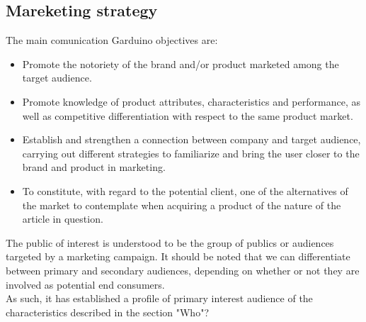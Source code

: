 \documentclass[11pt,a4paper]{article}
\begin{document}
\subsection{Mareketing strategy}
The main comunication Garduino objectives are:
\begin{itemize}
\item Promote the notoriety of the brand and/or product marketed among the target audience.
\item Promote knowledge of product attributes, characteristics and performance, as well as competitive differentiation with respect to the same product market.
\item Establish and strengthen a connection between company and target audience, carrying out different strategies to familiarize and bring the user closer to the brand and product in marketing.
\item To constitute, with regard to the potential client, one of the alternatives of the market to contemplate when acquiring a product of the nature of the article in question.
\end{itemize}

The public of interest is understood to be the group of publics or audiences targeted by a marketing campaign. It should be noted that we can differentiate between primary and secondary audiences, depending on whether or not they are involved as potential end consumers.\\

As such, it has established a profile of primary interest audience of the characteristics described in the section "Who"?\\ 
\end{document}
